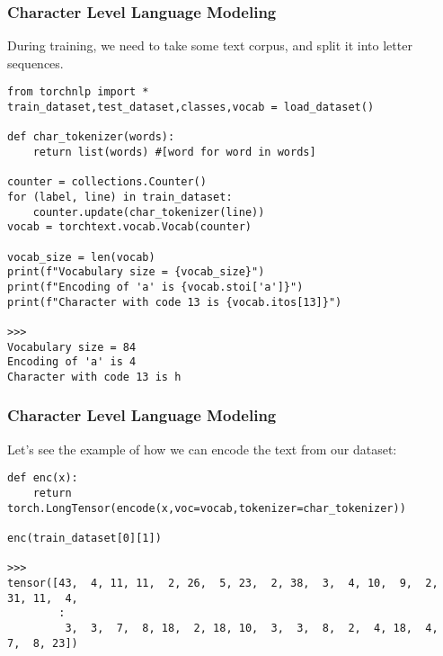 \begin{frame}[fragile] \frametitle{Character Level Language Modeling}

During training, we need to take some text corpus, and split it into letter sequences.

\begin{lstlisting}
from torchnlp import *
train_dataset,test_dataset,classes,vocab = load_dataset()

def char_tokenizer(words):
    return list(words) #[word for word in words]

counter = collections.Counter()
for (label, line) in train_dataset:
    counter.update(char_tokenizer(line))
vocab = torchtext.vocab.Vocab(counter)

vocab_size = len(vocab)
print(f"Vocabulary size = {vocab_size}")
print(f"Encoding of 'a' is {vocab.stoi['a']}")
print(f"Character with code 13 is {vocab.itos[13]}")

>>>
Vocabulary size = 84
Encoding of 'a' is 4
Character with code 13 is h
\end{lstlisting}

\end{frame}

\begin{frame}[fragile] \frametitle{Character Level Language Modeling}

Let's see the example of how we can encode the text from our dataset:
\begin{lstlisting}
def enc(x):
    return torch.LongTensor(encode(x,voc=vocab,tokenizer=char_tokenizer))

enc(train_dataset[0][1])

>>>
tensor([43,  4, 11, 11,  2, 26,  5, 23,  2, 38,  3,  4, 10,  9,  2, 31, 11,  4,
        :
         3,  3,  7,  8, 18,  2, 18, 10,  3,  3,  8,  2,  4, 18,  4,  7,  8, 23])
\end{lstlisting}

\end{frame}


